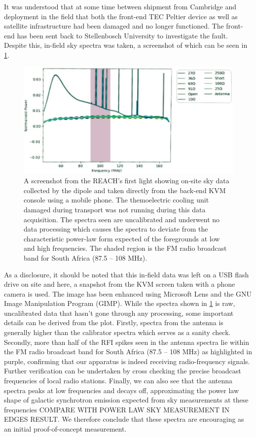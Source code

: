 It was understood that at some time between shipment from Cambridge and deployment in the field that both the front-end TEC Peltier device as well as satellite infrastructure had been damaged and no longer functioned. The front-end has been sent back to Stellenbosch University to investigate the fault. Despite this, in-field sky spectra was taken, a screenshot of which can be seen in \cref{fig:onsite_data}.
\begin{figure}
    \centering
    \includegraphics[scale=0.4]{onsite_data}
    \caption{A screenshot from the REACH's first light showing on-site sky data collected by the dipole and taken directly from the back-end KVM console using a mobile phone. The themoelectric cooling unit damaged during transport was not running during this data acquisition. The spectra seen are uncalibrated and underwent no data processing which causes the spectra to deviate from the characteristic power-law form expected of the foregrounds at low and high frequencies. The shaded region is the FM radio broadcast band for South Africa (87.5 -- 108 MHz).}
    \label{fig:onsite_data}
\end{figure}
As a disclosure, it should be noted that this in-field data was left on a USB flash drive on site and here, a snapshot from the KVM screen taken with a phone camera is used. The image has been enhanced using Microsoft Lens and the GNU Image Manipulation Program (GIMP). While the spectra shown in \cref{fig:onsite_data} is raw, uncalibrated data that hasn't gone through any processing, some important details can be derived from the plot. Firstly, spectra from the antenna is generally higher than the calibrator spectra which serves as a sanity check. Secondly, more than half of the RFI spikes seen in the antenna spectra lie within the FM radio broadcast band for South Africa (87.5 -- 108 MHz) as highlighted in purple, confirming that our apparatus is indeed receiving radio-frequency signals. Further verification can be undertaken by cross checking the precise broadcast frequencies of local radio stations. Finally, we can also see that the antenna spectra peaks at low frequencies and decays off, approximating the power law shape of galactic synchrotron emission expected from sky measurements at these frequencies COMPARE WITH POWER LAW SKY MEASUREMENT IN EDGES RESULT. We therefore conclude that these spectra are encouraging as an initial proof-of-concept measurement.

